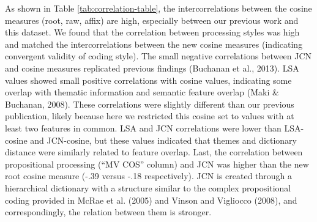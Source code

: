 \documentclass[english,,man]{apa6}
\begin{document}
As shown in Table \ref{tab:correlation-table}, the intercorrelations between the cosine measures (root, raw, affix) are high, especially between our previous work and this dataset. We found that the correlation between processing styles was high and matched the intercorrelations between the new cosine measures (indicating convergent validity of coding style). The small negative correlations between JCN and cosine measures replicated previous findings (Buchanan et al., 2013). LSA values showed small positive correlations with cosine values, indicating some overlap with thematic information and semantic feature overlap (Maki \& Buchanan, 2008). These correlations were slightly different than our previous publication, likely because here we restricted this cosine set to values with at least two features in common. LSA and JCN correlations were lower than LSA-cosine and JCN-cosine, but these values indicated that themes and dictionary distance were similarly related to feature overlap. Last, the correlation between propositional processing (\enquote{MV COS} column) and JCN was higher than the new root cosine measure (-.39 versus -.18 respectively). JCN is created through a hierarchical dictionary with a structure similar to the complex propositional coding provided in McRae et al. (2005) and Vinson and Vigliocco (2008), and correspondingly, the relation between them is stronger.
\end{document}
